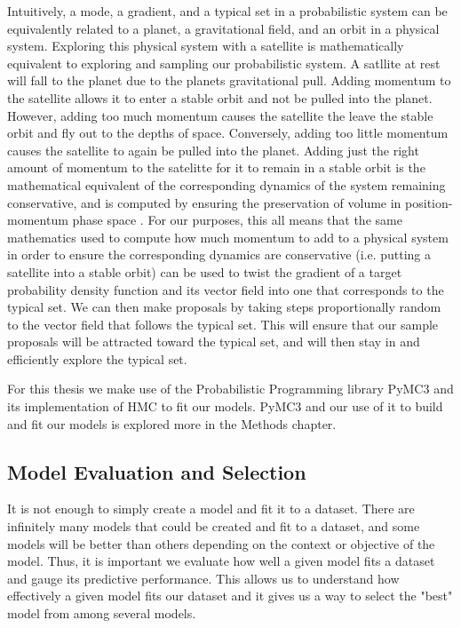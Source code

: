 Intuitively, a mode, a gradient, and a typical set in a probabilistic system can be equivalently related to a planet, a gravitational field, and an orbit in a physical system. Exploring this physical system with a satellite is mathematically equivalent to exploring and sampling our probabilistic system. A satllite at rest will fall to the planet due to the planets gravitational pull. Adding momentum to the satellite allows it to enter a stable orbit and not be pulled into the planet. However, adding too much momentum causes the satellite the leave the stable orbit and fly out to the depths of space. Conversely, adding too little momentum causes the satellite to again be pulled into the planet. Adding just the right amount of momentum to the satelitte for it to remain in a stable orbit is the mathematical equivalent of the corresponding dynamics of the system remaining conservative, and is computed by ensuring the preservation of volume in position-momentum phase space \cite{Betancourt2017}. For our purposes, this all means that the same mathematics used to compute how much momentum to add to a physical system in order to ensure the corresponding dynamics are conservative (i.e. putting a satellite into a stable orbit) can be used to twist the gradient of a target probability density function and its vector field into one that corresponds to the typical set. We can then make proposals by taking steps proportionally random to the vector field that follows the typical set. This will ensure that our sample proposals will be attracted toward the typical set, and will then stay in and efficiently explore the typical set.

For this thesis we make use of the Probabilistic Programming library PyMC3 \cite{pymc3} and its implementation of HMC to fit our models. PyMC3 and our use of it to build and fit our models is explored more in the Methods chapter.

\subsection{Model Evaluation and Selection}

It is not enough to simply create a model and fit it to a dataset. There are infinitely many models that could be created and fit to a dataset, and some models will be better than others depending on the context or objective of the model. Thus, it is important we evaluate how well a given model fits a dataset and gauge its predictive performance. This allows us to understand how effectively a given model fits our dataset and it gives us a way to select the "best" model from among several models.

